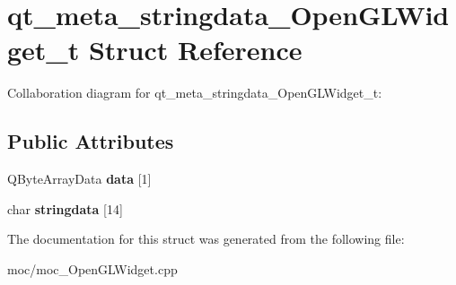 \hypertarget{structqt__meta__stringdata___open_g_l_widget__t}{\section{qt\-\_\-meta\-\_\-stringdata\-\_\-\-Open\-G\-L\-Widget\-\_\-t Struct Reference}
\label{structqt__meta__stringdata___open_g_l_widget__t}
}


Collaboration diagram for qt\-\_\-meta\-\_\-stringdata\-\_\-\-Open\-G\-L\-Widget\-\_\-t\-:
\subsection*{Public Attributes}
\begin{DoxyCompactItemize}
\item 
\hypertarget{structqt__meta__stringdata___open_g_l_widget__t_a2795d5aecfcc2e1e989beef288ce9589}{Q\-Byte\-Array\-Data {\bfseries data} \mbox{[}1\mbox{]}}\label{structqt__meta__stringdata___open_g_l_widget__t_a2795d5aecfcc2e1e989beef288ce9589}

\item 
\hypertarget{structqt__meta__stringdata___open_g_l_widget__t_ae1cec97851390defd3489d28a006056e}{char {\bfseries stringdata} \mbox{[}14\mbox{]}}\label{structqt__meta__stringdata___open_g_l_widget__t_ae1cec97851390defd3489d28a006056e}

\end{DoxyCompactItemize}


The documentation for this struct was generated from the following file\-:\begin{DoxyCompactItemize}
\item 
moc/moc\-\_\-\-Open\-G\-L\-Widget.\-cpp\end{DoxyCompactItemize}
